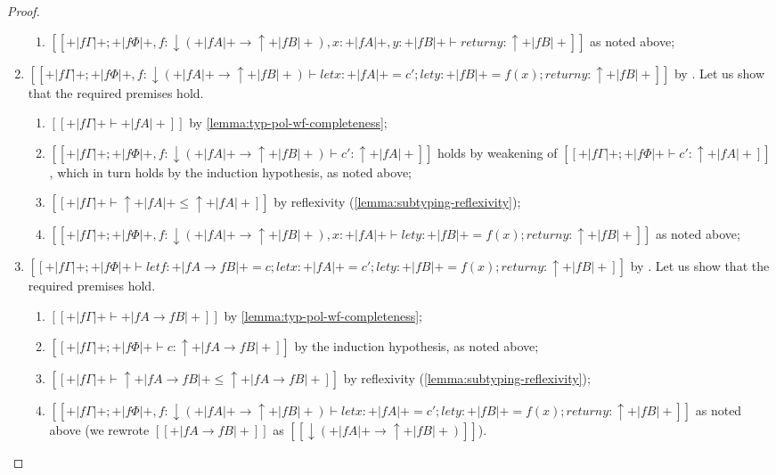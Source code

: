 \begin{proof}
\begin{caseof}
\begin{enumerate}
\begin{enumerate}
            \item $[[+|fΓ|+ ; +|fΦ|+, f:↓(+|fA|+ → ↑+|fB|+), x:+|fA|+, y:+|fB|+ ⊢ return y : ↑+|fB|+]]$ 
            as noted above;
          \end{enumerate}
        \item $[[+|fΓ|+ ; +|fΦ|+, f:↓(+|fA|+ → ↑+|fB|+) ⊢ let x:+|fA|+ = c'; let y:+|fB|+ = f(x); return y : ↑+|fB|+]]$ by 
          . Let us show that the 
          required premises hold. 
          \begin{enumerate}
            \item $[[+|fΓ|+ ⊢ +|fA|+]]$ by \cref{lemma:typ-pol-wf-completeness};
            \item $[[+|fΓ|+ ; +|fΦ|+, f:↓(+|fA|+ → ↑+|fB|+) ⊢ c' : ↑+|fA|+]]$
              holds by weakening of $[[+|fΓ|+ ; +|fΦ|+ ⊢ c' : ↑+|fA|+]]$, which in turn holds by the induction hypothesis,
              as noted above;
            \item $[[+|fΓ|+  ⊢ ↑+|fA|+ ≤ ↑+|fA|+]]$ by reflexivity (\cref{lemma:subtyping-reflexivity});
            \item $[[+|fΓ|+ ; +|fΦ|+, f:↓(+|fA|+ → ↑+|fB|+), x:+|fA|+ ⊢ let y:+|fB|+ = f(x); return y : ↑+|fB|+]]$ as noted above;
          \end{enumerate}
        \item $[[+|fΓ|+ ; +|fΦ|+ ⊢ let f : +|fA → fB|+ = c; let x : +|fA|+ = c'; let y:+|fB|+ = f(x); return y : ↑+|fB|+]]$ by 
          . Let us show that the 
          required premises hold. 
          \begin{enumerate}
            \item $[[+|fΓ|+ ⊢ +|fA → fB|+]]$ by \cref{lemma:typ-pol-wf-completeness};
            \item $[[+|fΓ|+ ; +|fΦ|+ ⊢ c : ↑+|fA → fB|+]]$ by the induction hypothesis, as noted above;
            \item $[[+|fΓ|+  ⊢ ↑+|fA → fB|+ ≤ ↑+|fA → fB|+]]$ by reflexivity (\cref{lemma:subtyping-reflexivity});
            \item $[[+|fΓ|+ ; +|fΦ|+, f:↓(+|fA|+ → ↑+|fB|+) ⊢ let x:+|fA|+ = c'; let y:+|fB|+ = f(x); return y : ↑+|fB|+]]$ 
              as noted above (we rewrote $[[+|fA → fB|+]]$ as $[[↓(+|fA|+ → ↑+|fB|+)]]$).
          \end{enumerate}
      \end{enumerate}


\end{caseof}
\end{proof}
